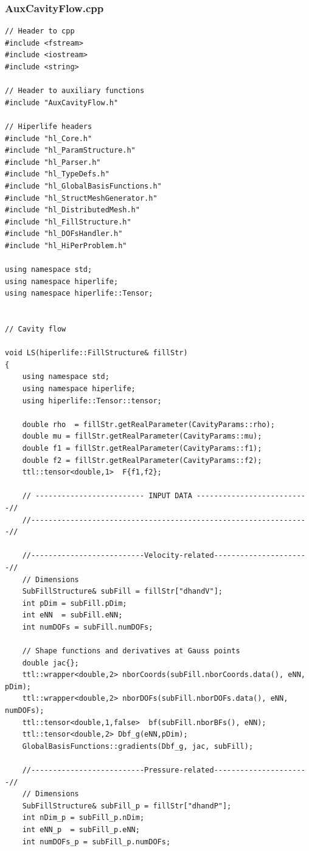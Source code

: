 \documentclass[]{article}
\begin{document}
\subsubsection{AuxCavityFlow.cpp} \label{sec: a.cpp}
\begin{lstlisting}
// Header to cpp
#include <fstream>
#include <iostream>
#include <string>

// Header to auxiliary functions
#include "AuxCavityFlow.h"

// Hiperlife headers
#include "hl_Core.h"
#include "hl_ParamStructure.h"
#include "hl_Parser.h"
#include "hl_TypeDefs.h"
#include "hl_GlobalBasisFunctions.h"
#include "hl_StructMeshGenerator.h"
#include "hl_DistributedMesh.h"
#include "hl_FillStructure.h"
#include "hl_DOFsHandler.h"
#include "hl_HiPerProblem.h"

using namespace std;
using namespace hiperlife;
using namespace hiperlife::Tensor;


// Cavity flow

void LS(hiperlife::FillStructure& fillStr)
{
	using namespace std;
	using namespace hiperlife;
	using hiperlife::Tensor::tensor;
	
	double rho  = fillStr.getRealParameter(CavityParams::rho);
	double mu = fillStr.getRealParameter(CavityParams::mu);
	double f1 = fillStr.getRealParameter(CavityParams::f1);
	double f2 = fillStr.getRealParameter(CavityParams::f2);
	ttl::tensor<double,1>  F{f1,f2};
	
	// ------------------------- INPUT DATA --------------------------//
	//----------------------------------------------------------------//
	
	//--------------------------Velocity-related----------------------//
	// Dimensions
	SubFillStructure& subFill = fillStr["dhandV"];
	int pDim = subFill.pDim;
	int eNN  = subFill.eNN;
	int numDOFs = subFill.numDOFs;
	
	// Shape functions and derivatives at Gauss points
	double jac{};
	ttl::wrapper<double,2> nborCoords(subFill.nborCoords.data(), eNN, pDim);
	ttl::wrapper<double,2> nborDOFs(subFill.nborDOFs.data(), eNN, numDOFs);
	ttl::tensor<double,1,false>  bf(subFill.nborBFs(), eNN);
	ttl::tensor<double,2> Dbf_g(eNN,pDim);
	GlobalBasisFunctions::gradients(Dbf_g, jac, subFill);
	
	//--------------------------Pressure-related----------------------//
	// Dimensions
	SubFillStructure& subFill_p = fillStr["dhandP"];
	int nDim_p = subFill_p.nDim;
	int eNN_p  = subFill_p.eNN;
	int numDOFs_p = subFill_p.numDOFs;
	

\end{lstlisting}
\end{document}
